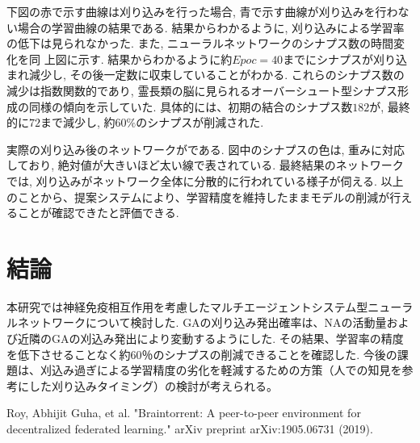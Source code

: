 \documentclass[a4paper, 10.5pt,twocolumn,dvipdfmx]{jsarticle}
\begin{document}
下図の赤で示す曲線は刈り込みを行った場合, 
青で示す曲線が刈り込みを行わない場合の学習曲線の結果である.
結果からわかるように, 刈り込みによる学習率の低下は見られなかった.
また, ニューラルネットワークのシナプス数の時間変化を同
上図に示す.
結果からわかるように約$Epoc=40$までにシナプスが刈り込まれ減少し, 
その後一定数に収束していることがわかる.
これらのシナプス数の減少は指数関数的であり, 
霊長類の脳に見られるオーバーシュート型シナプス形成の同様の傾向を示していた.
具体的には、初期の結合のシナプス数$182$が, 最終的に$72$まで減少し, 
約$60\%$のシナプスが削減された.

実際の刈り込み後のネットワークがである.
図中のシナプスの色は, 重みに対応しており, 絶対値が大きいほど太い線で表されている.
最終結果のネットワークでは, 刈り込みがネットワーク全体に分散的に行われている様子が伺える.
以上のことから、提案システムにより、学習精度を維持したままモデルの削減が行えることが確認できたと評価できる.
\section{結論}
本研究では神経免疫相互作用を考慮したマルチエージェントシステム型ニューラルネットワークについて検討した.
GAの刈り込み発出確率は、NAの活動量および近隣のGAの刈込み発出により変動するようにした.
その結果、学習率の精度を低下させることなく約60％のシナプスの削減できることを確認した.
今後の課題は、刈込み過ぎによる学習精度の劣化を軽減するための方策（人での知見を参考にした刈り込みタイミング）の検討が考えられる。
 \begin{thebibliography}{99}
  Roy, Abhijit Guha, et al. "Braintorrent: A peer-to-peer environment for decentralized federated learning." arXiv preprint arXiv:1905.06731 (2019).
\end{thebibliography}
 
\end{document}
